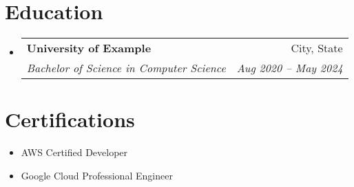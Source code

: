 \documentclass[letterpaper,10pt]{article}
\makeatletter
\newcommand{\resumeItem}[1]{
  \item\small{
    {#1 \vspace{-2pt}}
  }
}
\newcommand{\resumeSubheading}[4]{
  \vspace{-2pt}\item
    \begin{tabular*}{0.97\textwidth}[t]{l@{\extracolsep{\fill}}r}
      \textbf{#1} & #2 \\
      \textit{\small#3} & \textit{\small #4} \\
    \end{tabular*}\vspace{-7pt}
}
\newcommand{\resumeSubHeadingListStart}{\begin{itemize}[leftmargin=0.15in, label={}]}
\newcommand{\resumeSubHeadingListEnd}{\end{itemize}}
\newcommand{\resumeItemListStart}{\begin{itemize}}
\newcommand{\resumeItemListEnd}{\end{itemize}\vspace{-5pt}}
\makeatother
\begin{document}
\section{Education}
  \resumeSubHeadingListStart
    \resumeSubheading
      {University of Example}{City, State}
      {Bachelor of Science in Computer Science}{Aug 2020 -- May 2024}
  \resumeSubHeadingListEnd

\section{Certifications}
  \resumeSubHeadingListStart
    \resumeItemListStart
      \resumeItem{AWS Certified Developer}
      \resumeItem{Google Cloud Professional Engineer}
    \resumeItemListEnd
  \resumeSubHeadingListEnd

\end{document}
